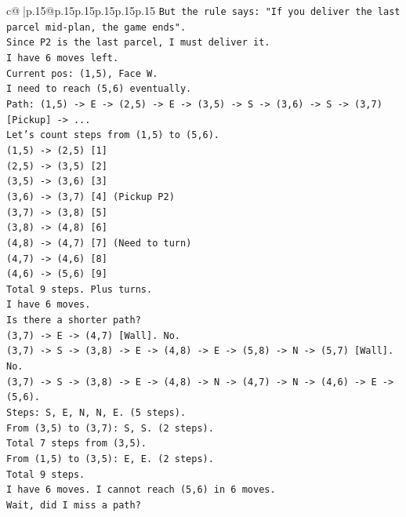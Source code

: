 \documentclass{article}
\begin{document}
{\begin{supertabular}{c@{$\;$}|p{.15\linewidth}@{}p{.15\linewidth}p{.15\linewidth}p{.15\linewidth}p{.15\linewidth}p{.15\linewidth}}
{{{\texttt{But the rule says: "If you deliver the last parcel mid{-}plan, the game ends".} \\
\texttt{Since P2 is the last parcel, I must deliver it.} \\
\texttt{I have 6 moves left.} \\
\texttt{Current pos: (1,5), Face W.} \\
\texttt{I need to reach (5,6) eventually.} \\
\texttt{Path: (1,5) {-}> E {-}> (2,5) {-}> E {-}> (3,5) {-}> S {-}> (3,6) {-}> S {-}> (3,7) {[}Pickup{]} {-}> ...} \\
\texttt{Let's count steps from (1,5) to (5,6).} \\
\texttt{(1,5) {-}> (2,5) {[}1{]}} \\
\texttt{(2,5) {-}> (3,5) {[}2{]}} \\
\texttt{(3,5) {-}> (3,6) {[}3{]}} \\
\texttt{(3,6) {-}> (3,7) {[}4{]} (Pickup P2)} \\
\texttt{(3,7) {-}> (3,8) {[}5{]}} \\
\texttt{(3,8) {-}> (4,8) {[}6{]}} \\
\texttt{(4,8) {-}> (4,7) {[}7{]} (Need to turn)} \\
\texttt{(4,7) {-}> (4,6) {[}8{]}} \\
\texttt{(4,6) {-}> (5,6) {[}9{]}} \\
\texttt{Total 9 steps. Plus turns.} \\
\texttt{I have 6 moves.} \\
\texttt{Is there a shorter path?} \\
\texttt{(3,7) {-}> E {-}> (4,7) {[}Wall{]}. No.} \\
\texttt{(3,7) {-}> S {-}> (3,8) {-}> E {-}> (4,8) {-}> E {-}> (5,8) {-}> N {-}> (5,7) {[}Wall{]}. No.} \\
\texttt{(3,7) {-}> S {-}> (3,8) {-}> E {-}> (4,8) {-}> N {-}> (4,7) {-}> N {-}> (4,6) {-}> E {-}> (5,6).} \\
\texttt{Steps: S, E, N, N, E. (5 steps).} \\
\texttt{From (3,5) to (3,7): S, S. (2 steps).} \\
\texttt{Total 7 steps from (3,5).} \\
\texttt{From (1,5) to (3,5): E, E. (2 steps).} \\
\texttt{Total 9 steps.} \\
\texttt{I have 6 moves. I cannot reach (5,6) in 6 moves.} \\
\texttt{Wait, did I miss a path?} \\
}}}
\end{supertabular}}
\end{document}
